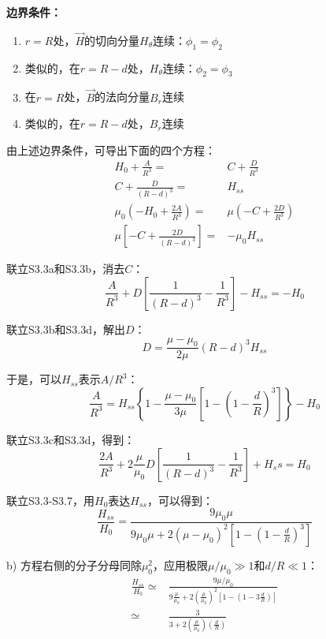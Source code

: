 \textbf{边界条件：}

\begin{enumerate}
  \item $r=R$处，$\vec{H}$的切向分量$H_\theta$连续：$\phi_1=\phi_2   $
  \item 类似的，在$r=R-d$处，$H_\theta$连续：$\phi_2=\phi_3  $
  \item 在$r=R$处，$\vec{B}$的法向分量$B_r$连续
  \item 类似的，在$r=R-d$处，$B_r$连续
\end{enumerate}

由上述边界条件，可导出下面的四个方程：
\begin{align}
  H_0+\frac{A}{R^3}=& C+\frac{D}{R^3} \nonumber \tag{S3.3a}\\
  C+\frac{D}{(R-d)^3}=& H_{ss} \nonumber \tag{S3.3b}\\
  \mu_0(-H_0+\frac{2A}{R^3})=& \mu\left(-C+\frac{2D}{R^3}\right)\nonumber \tag{S3.3c} \\
  \mu\left[-C+\frac{2D}{(R-d)^3}\right]=& -\mu_0 H_{ss} \nonumber\tag{S3.3d}
\end{align}

联立S3.3a和S3.3b，消去$C$：
\begin{equation*}
\frac{A}{R^3}+D\left[\frac{1}{(R-d)^3}-\frac{1}{R^3}\right]-H_{ss} =-H_0 \tag{S3.4}
\end{equation*}


联立S3.3b和S3.3d，解出$D$：
\begin{equation*}
D=\frac{\mu-\mu_0}{2\mu} (R-d)^3 H_{ss}  \tag{S3.5}
\end{equation*}

于是，可以$H_{ss}$表示$A/R^3$：
\begin{equation*}
\frac{A}{R^3}=H_{ss}\left\{1-\frac{\mu-\mu_0}{3\mu}\left[1-\left(1-\frac{d}{R}\right)^3\right]\right\}-H_0   \tag{S3.6}
\end{equation*}

联立S3.3c和S3.3d，得到：
\begin{equation*}
\frac{2A}{R^3}+2\frac{\mu}{\mu_0}D\left[\frac{1}{(R-d)^3}-\frac{1}{R^3}\right]+H_ss =H_0  \tag{S3.7}
\end{equation*}

联立S3.3-S3.7，用$H_0$表达$H_{ss}$，可以得到：
\begin{equation*}
\frac{H_{ss}}{H_0}=\frac{9\mu_0 \mu}{9\mu_0 \mu+2(\mu-\mu_0)^2\left[1-\left(1-\frac{d}{R}\right)^3\right]}  \tag{2.46}
\end{equation*}

b) 方程右侧的分子分母同除$\mu_0^2$，应用极限$\mu/\mu_0\gg 1$和$d/R\ll 1$：
\begin{align}
\frac{H_{ss}}{H_0}\simeq& \frac{9\mu/\mu_0}{9\frac{\mu}{\mu_0}+2(\frac{\mu}{\mu_0})^2\left[1-(1-3\frac{d}{R})\right]} \nonumber\tag{S3.8}\\
\simeq&\frac{3}{3+2(\frac{\mu}{\mu_0})(\frac{d}{R})}\nonumber \tag{S3.9}
\end{align}

